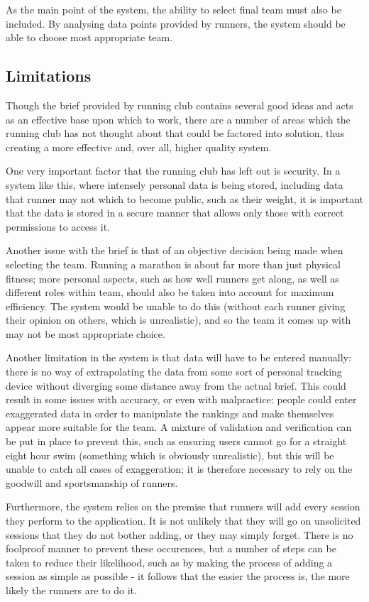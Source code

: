 \documentclass{article}[12pt,a4paper]
\begin{document}
As the main point of the system, the ability to select final team must also be included. By analysing data points provided by runners, the system should be able to choose most appropriate team.

\subsection{Limitations}
Though the brief provided by running club contains several good ideas and acts as an effective base upon which to work, there are a number of areas which the running club has not thought about that could be factored into solution, thus creating a more effective and, over all, higher quality system. 

One very important factor that the running club has left out is security. In a system like this, where intensely personal data is being stored, including data that runner may not which to become public, such as their weight, it is important that the data is stored in a secure manner that allows only those with correct permissions to access it. 

Another issue with the brief is that of an objective decision being made when selecting the team. Running a marathon is about far more than just physical fitness; more personal aspects, such as how well runners get along, as well as different roles within team, should also be taken into account for maximum efficiency. The system would be unable to do this (without each runner giving their opinion on others, which is unrealistic), and so the team it comes up with may not be most appropriate choice. 

Another limitation in the system is that data will have to be entered manually: there is no way of extrapolating the data from some sort of personal tracking device without diverging some distance away from the actual brief. This could result in some issues with accuracy, or even with malpractice: people could enter exaggerated data in order to manipulate the rankings and make themselves appear more suitable for the team. A mixture of validation and verification can be put in place to prevent this, such as ensuring users cannot go for a straight eight hour swim (something which is obviously unrealistic), but this will be unable to catch all cases of exaggeration; it is therefore necessary to rely on the goodwill and sportsmanship of runners.

Furthermore, the system relies on the premise that runners will add every session they perform to the application. It is not unlikely that they will go on unsolicited sessions that they do not bother adding, or they may simply forget. There is no foolproof manner to prevent these occurences, but a number of steps can be taken to reduce their likelihood, such as by making the process of adding a session as simple as possible - it follows that the easier the process is, the more likely the runners are to do it.
\end{document}
